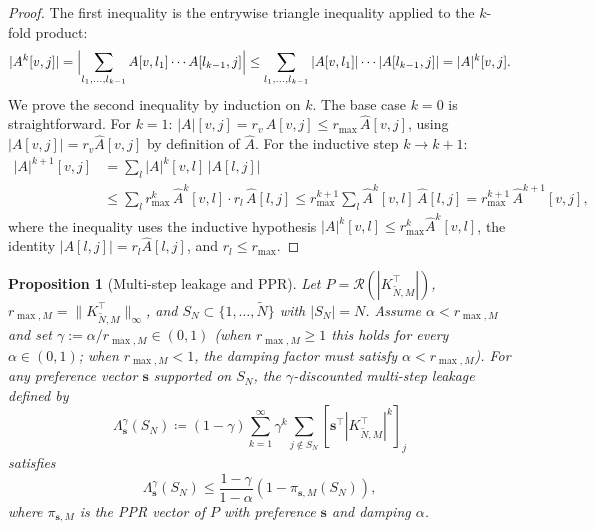 \documentclass{article}
\theoremstyle{plain}
\newtheorem{proposition}[theorem]{Proposition}
\theoremstyle{definition}
\def\tp{\intercal}
\begin{document}
\begin{proof}%
	The first inequality is the entrywise triangle inequality applied to the $k$-fold product:
	\begin{equation*}
		|A^k[v,j]| = \Bigl|\sum_{l_1,\ldots,l_{k-1}} A[v,l_1]\cdots A[l_{k-1},j]\Bigr| \leq \sum_{l_1,\ldots,l_{k-1}} |A[v,l_1]|\cdots |A[l_{k-1},j]| = |A|^k[v,j].
	\end{equation*}
	We prove the second inequality by induction on $k$. The base case $k=0$ is straightforward. For $k=1$: $|A|[v,j] = r_v\,\hat A[v,j] \leq r_{\max}\,\hat A[v,j]$, using $|A[v,j]| = r_v\hat A[v,j]$ by definition of $\hat A$. For the inductive step $k \to k+1$:
	\begin{align*}
		|A|^{k+1}[v,j] &= \sum_l |A|^k[v,l]\, |A[l,j]| \\
		&\leq \sum_l r_{\max}^k\,\hat A^k[v,l] \cdot r_l\,\hat A[l,j] \leq r_{\max}^{k+1} \sum_l \hat A^k[v,l]\,\hat A[l,j] = r_{\max}^{k+1}\,\hat A^{k+1}[v,j],
	\end{align*}
	where the inequality uses the inductive hypothesis $|A|^k[v,l] \leq r_{\max}^k \hat A^k[v,l]$, the identity $|A[l,j]| = r_l\hat A[l,j]$, and $r_l \leq r_{\max}$.
\end{proof}

\begin{proposition}[Multi-step leakage and PPR]\label{prop:unconditional}
	Let $P = \mathcal{R}(|K_{\tilde{N},M}^{\tp}|)$, $r_{\max,M} = \|K_{\tilde{N},M}^{\tp}\|_\infty$, and $S_N \subset \{1,\ldots,\tilde{N}\}$ with $|S_N| = N$. Assume $\alpha < r_{\max,M}$ and set $\gamma := \alpha/r_{\max,M} \in (0,1)$ (when $r_{\max,M} \geq 1$ this holds for every $\alpha \in (0,1)$; when $r_{\max,M} < 1$, the damping factor must satisfy $\alpha < r_{\max,M}$). For any preference vector $\mathbf{s}$ supported on $S_N$, the \emph{$\gamma$-discounted multi-step leakage} defined by
	\begin{equation}\label{eq:leakage-ppr}
		\Lambda_{\mathbf{s}}^{\gamma}(S_N)\coloneqq(1-\gamma)\sum_{k=1}^{\infty} \gamma^k \sum_{j \notin S_N} [\mathbf{s}^\tp  |K_{\tilde{N},M}^{\tp}|^k]_j
	\end{equation}
	satisfies
	$$
	\Lambda_{\mathbf{s}}^{\gamma}(S_N) \leq \frac{1-\gamma}{1-\alpha} \left(1 - \pi_{\mathbf{s}, M}(S_N)\right),
	$$
	where $\pi_{\mathbf{s}, M}$ is the PPR vector of $P$ with preference $\mathbf{s}$ and damping $\alpha$.
\end{proposition}
\end{document}
